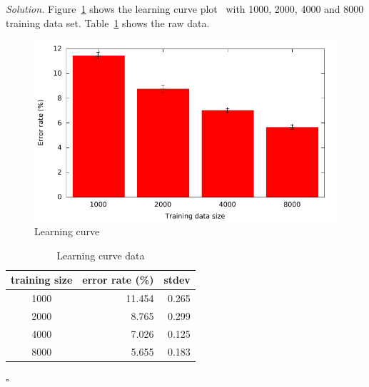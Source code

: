 \documentclass[11pt]{article}
\theoremstyle{definition}
\newenvironment{solution}{\noindent\emph{Solution.}}{\hfill$\square$}
\begin{document}
\begin{solution}
Figure~\ref{fig:lc} shows the learning curve plot~\cite{gnuplot-so} with 1000, 2000, 4000 and 8000 training data set. Table~\ref{tbl:lc} shows the raw data.

\begin {figure}[h]
    \includegraphics{figures/fig1}
	\caption{Learning curve}
	\label{fig:lc}
\end {figure}

\begin{table}[h]
\centering
\begin{tabular}{|c|r|r|}
\hline
\textbf{training size} & \multicolumn{1}{c|}{\textbf{error rate (\%)}} & \multicolumn{1}{c|}{\textbf{stdev}} \\ \hline
1000                   & 11.454                                        & 0.265                               \\ \hline
2000                   & 8.765                                         & 0.299                               \\ \hline
4000                   & 7.026                                         & 0.125                               \\ \hline
8000                   & 5.655                                         & 0.183                               \\ \hline
\end{tabular}
\caption{Learning curve data}
\label{tbl:lc}
\end{table}

\end{solution}

\newpage

\end{document}
